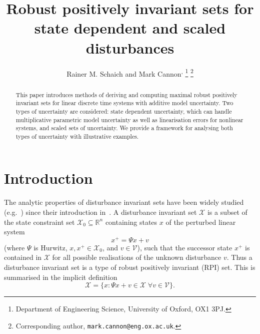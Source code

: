 \documentclass[letterpaper, 10pt, conference]{ieeeconf} %
\begin{document}
  \title{Robust positively invariant sets for state dependent and scaled disturbances}

\author{Rainer M. Schaich\textsuperscript{\dag} %
         and Mark Cannon\textsuperscript{\dag,\ddag}%
\thanks{\textsuperscript{\dag} Department of Engineering Science, University of Oxford, OX1 3PJ.}%
\thanks{\textsuperscript{\ddag} Corresponding author, 
        \texttt{mark.cannon@eng.ox.ac.uk}.}
}
\newcommand{\note}[1]{\todo[inline]{#1}}

\maketitle

\begin{abstract} 
  This paper introduces methods of deriving and computing maximal robust positively invariant sets 
  for linear discrete time systems with additive model uncertainty. Two types of uncertainty are 
  considered: state dependent uncertainty, which can handle multiplicative parametric model uncertainty 
  as well as linearisation errors for nonlinear systems, and scaled
  sets of uncertainty. We provide 
  a framework for analysing both types of uncertainty with illustrative examples.
\end{abstract}


\section{Introduction}
The analytic properties of disturbance invariant sets have been widely
studied (e.g.~\cite{blanchini:2007}) 
since their introduction in~\cite{Glover:1971,bertsekas71}. A disturbance invariant set $\mathscr X$ is a subset of the 
state constraint set $\mathcal X_0\subseteq\mathbb R^n$ containing
states $x$ of the perturbed linear system
\begin{equation}\label{eq:system:equation}
	x^+ = \Psi x + v
\end{equation}
(where $\Psi$ is Hurwitz, $x,x^+\in\mathcal X_0$, and 
$v\in\mathscr V$), such that the successor state $x^+$ is contained in $\mathscr X$
for all possible realisations of the 
unknown disturbance $v$. Thus a disturbance invariant set is a type of robust positively invariant (RPI) set. 
This is summarised in the implicit definition
\begin{equation}\label{eq:definition:MRPI:set:state:dependent}
	\mathscr X = \{x:\Psi x + v\in\mathscr X\; \forall v\in\mathscr V\}.
\end{equation}
\end{document}
